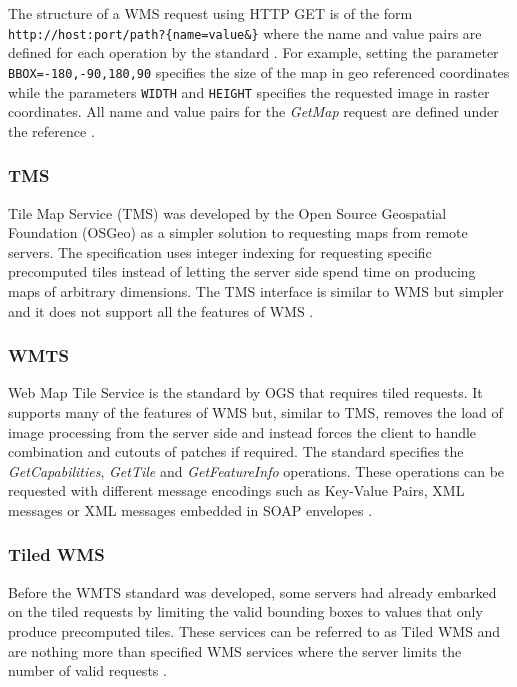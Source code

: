 The structure of a WMS request using HTTP GET is of the form \\ \texttt{http://host\lbrack:port\rbrack/path\lbrack?\{name\lbrack=value\rbrack\&\}} where the name and value pairs are defined for each operation by the standard \cite{wms06}. For example, setting the parameter \texttt{BBOX=-180,-90,180,90} specifies the size of the map in geo referenced coordinates while the parameters \texttt{WIDTH} and \texttt{HEIGHT} specifies the requested image in raster coordinates. All name and value pairs for the \emph{GetMap} request are defined under the reference \cite{wms06}.

\subsubsection{TMS}

Tile Map Service (TMS) was developed by the Open Source Geospatial Foundation (OSGeo) as a simpler solution to requesting maps from remote servers. The specification uses integer indexing for requesting specific precomputed tiles instead of letting the server side spend time on producing maps of arbitrary dimensions. The TMS interface is similar to WMS but simpler and it does not support all the features of WMS \cite{tms}.

\subsubsection{WMTS}

Web Map Tile Service is the standard by OGS that requires tiled requests. It supports many of the features of WMS but, similar to TMS, removes the load of image processing from the server side and instead forces the client to handle combination and cutouts of patches if required. The standard specifies the \emph{GetCapabilities}, \emph{GetTile} and \emph{GetFeatureInfo} operations. These operations can be requested with different message encodings such as Key-Value Pairs, XML messages or XML messages embedded in SOAP envelopes \cite{wmts10}.

\subsubsection{Tiled WMS}

Before the WMTS standard was developed, some servers had already embarked on the tiled requests by limiting the valid bounding boxes to values that only produce precomputed tiles. These services can be referred to as Tiled WMS and are nothing more than specified WMS services where the server limits the number of valid requests \cite{wmts10}.

